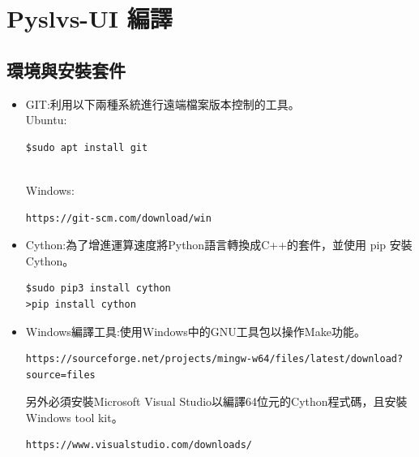 \documentclass[14pt,a4paper]{report}  %
\begin{document}
{      \section{Pyslvs-UI 編譯}



\subsection{環境與安裝套件}
		\begin{itemize}
		\item GIT:利用以下兩種系統進行遠端檔案版本控制的工具。
		\hspace*{\fill} \\
		Ubuntu:\\
		\begin{lstlisting}[caption=使用apt安裝Git]
$sudo apt install git
		\end{lstlisting}
		\hspace*{\fill} \\
		Windows:\\
		\begin{lstlisting}[caption=下載新版Git]
https://git-scm.com/download/win
		\end{lstlisting}
		\end{itemize}
     
     \begin{itemize}
		\item Cython:為了增進運算速度將Python語言轉換成C++的套件，並使用 pip 安裝 Cython。\\
		\begin{lstlisting}[caption=安裝 Cython]
$sudo pip3 install cython 
>pip install cython
		\end{lstlisting}
		\end{itemize}
		
	\begin{itemize}
		\item Windows編譯工具:使用Windows中的GNU工具包以操作Make功能。
		\begin{lstlisting}[caption=下載新版MinGW(32Bit）]
https://sourceforge.net/projects/mingw-w64/files/latest/download?source=files
		\end{lstlisting}
		另外必須安裝Microsoft Visual Studio以編譯64位元的Cython程式碼，且安裝Windows tool kit。
		\begin{lstlisting}[caption=安裝各類編譯程式]
https://www.visualstudio.com/downloads/
		\end{lstlisting}
		\end{itemize}
		   
}
\end{document}
